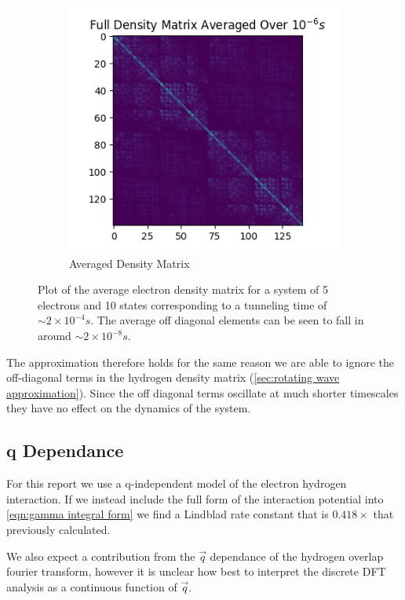 \begin{figure}[htbp]
\begin{subfigure}{0.45\linewidth}
        \includegraphics[width = 0.9\linewidth]{Figures/Discussion/Full average matrix 10-6s.png} %
        \caption{Averaged Density Matrix
        }\label{sub@fig:averaged density matrix}
    \end{subfigure}
    \caption{
    Plot of the average
    electron density matrix
    for a system of 5 electrons
    and 10 states
    corresponding to a tunneling time
    of \(\sim 2\times{}10^{-4}s\).
    The average off diagonal
    elements can be seen to
    fall in around
    \(\sim 2\times{}10^{-8}s\).
    }\label{fig:density matrix analysis}
\end{figure}
The approximation
therefore holds for the
same reason we are able
to ignore the off-diagonal
terms in the hydrogen density
matrix
(\cref{sec:rotating wave approximation}).
Since
the off diagonal terms
oscillate at much shorter
timescales they have
no effect on the dynamics
of the system.

\subsection{q Dependance}
For this report we use a
q-independent model of the
electron hydrogen interaction.
If we instead include the full form
of the interaction potential
into \cref{eqn:gamma integral form}
we find a
Lindblad rate constant that
is \(0.418 \times{}\) that
previously calculated.

We also expect a
contribution from the
\(\vec{q}\) dependance of the hydrogen overlap
fourier transform, however
it is unclear how best to
interpret the discrete DFT analysis
as a continuous
function of \(\vec{q}\).

